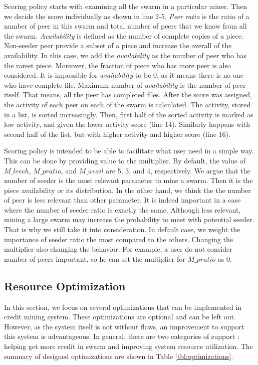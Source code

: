 Scoring policy starts with examining all the swarm in a particular miner. Then we decide the score individually as shown in line 2-5. \textit{Peer ratio} is the ratio of a number of peer in this swarm and total number of peers that we know from all the swarm. \textit{Availability} is defined as the number of complete copies of a piece. Non-seeder peer provide a subset of a piece and increase the overall of the availability. In this case, we add the \textit{availability} as the number of peer who has the rarest piece. Moreover, the fraction of piece who has more peer is also considered. It is impossible for \textit{availability} to be 0, as it means there is no one who have complete file. Maximum number of \textit{availability} is the number of peer itself. That means, all the peer has completed files. After the score was assigned, the activity of each peer on each of the swarm is calculated. The activity, stored in a list, is sorted increasingly. Then, first half of the sorted activity is marked as low activity, and given the lower activity score (line 14). Similarly happens with second half of the list, but with higher activity and higher score (line 16).

Scoring policy is intended to be able to facilitate what user need in a simple way. This can be done by providing value to the multiplier. By default, the value of $M\_leech$, $M\_pratio$, and $M\_avail$ are 5, 3, and 4, respectively. We argue that the number of seeder is the most relevant parameter to mine a swarm. Then it is the piece availability or its distribution. In the other hand, we think the the number of peer is less relevant than other parameter. It is indeed important in a case where the number of seeder ratio is exactly the same. Although less relevant, mining a large swarm may increase the probability to meet with potential seeder. That is why we still take it into consideration. In default case, we weight the importance of seeder ratio the most compared to the others. Changing the multiplier also changing the behavior. For example, a user do not consider number of peers important, so he can set the multiplier for $M\_pratio$ as 0. 

\subsection{Resource Optimization}
\label{section:optimization}
In this section, we focus on several optimizations that can be implemented in credit mining system. These optimizations are optional and can be left out. However, as the system itself is not without flaws, an improvement to support this system is advantageous. In general, there are two categories of support : helping get more credit in swarm and improving system resource utilization. The summary of designed optimizations are shown in Table \ref{tbl:optimizations}.

